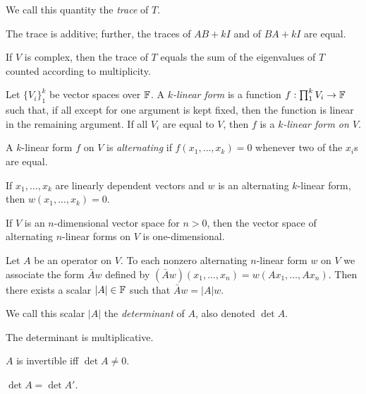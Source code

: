 \begin{defn}
  We call this quantity the \emph{trace} of $T$.
\end{defn}
\begin{prop}
  The trace is additive; further, the traces of $AB+kI$ and of $BA+kI$ are equal.
\end{prop}
\begin{prop}
  If $V$ is complex, then the trace of $T$ equals the sum of the eigenvalues of
  $T$ counted according to multiplicity.
\end{prop}
\begin{defn}
  Let $\{V_i\}_1^k$ be vector spaces over $\mathbb{F}$. A \emph{$k$-linear form} is a
  function $f:\prod_1^k V_i\to\mathbb{F}$ such that, if all except for one argument is
  kept fixed, then the function is linear in the remaining argument. If all
  $V_i$ are equal to $V$, then $f$ is a \emph{$k$-linear form on $V$}.
\end{defn}
\begin{defn}
  A $k$-linear form $f$ on $V$ is \emph{alternating} if $f(x_1,\ldots,x_k)=0$
  whenever two of the $x_i$s are equal.
\end{defn}
\begin{prop}
  If $x_1,\ldots,x_k$ are linearly dependent vectors and $w$ is an alternating
  $k$-linear form, then $w(x_1,\ldots,x_k)=0$.
\end{prop}
\begin{prop}
  If $V$ is an $n$-dimensional vector space for $n>0$, then the vector space of
  alternating $n$-linear forms on $V$ is one-dimensional.
\end{prop}
\begin{prop}
  Let $A$ be an operator on $V$. To each nonzero alternating $n$-linear form $w$
  on $V$ we associate the form $\bar Aw$ defined by $(\bar Aw)(x_1,\ldots,x_n)
  =w(Ax_1,\ldots,Ax_n)$. Then there exists a scalar $|A|\in\mathbb{F}$ such that
  $\bar Aw=|A|w$.
\end{prop}
\begin{defn}
  We call this scalar $|A|$ the \emph{determinant} of $A$, also denoted $\det
  A$.
\end{defn}
\begin{prop}
  The determinant is multiplicative.
\end{prop}
\begin{cor}
  $A$ is invertible iff $\det A\ne 0$.
\end{cor}
\begin{prop}
    $\det A=\det A'$.
\end{prop}
